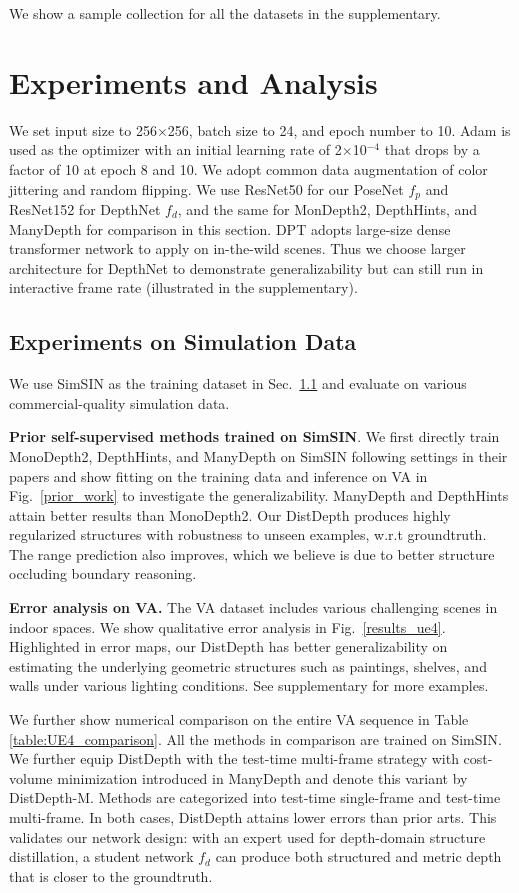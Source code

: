 \documentclass[10pt,twocolumn,letterpaper]{article}
\begin{document}
We show a sample collection for all the datasets in the supplementary.

\section{Experiments and Analysis}
\label{sec:analysis}

We set input size to 256$\times$256, batch size to 24, and epoch number to 10. Adam \cite{kingma2014adam} is used as the optimizer with an initial learning rate of 2$\times$10$^{-4}$ that drops by a factor of 10 at epoch 8 and 10. We adopt common data augmentation of color jittering and random flipping. We use ResNet50 for our PoseNet $f_p$ and ResNet152 for DepthNet $f_d$, and the same for MonDepth2, DepthHints, and ManyDepth for comparison in this section. DPT adopts large-size dense transformer network to apply on in-the-wild scenes. Thus we choose larger architecture for DepthNet to demonstrate generalizability but can still run in interactive frame rate (illustrated in the supplementary).

\subsection{Experiments on Simulation Data}
\label{sec:exp_sim}
We use SimSIN as the training dataset in Sec.~\ref{sec:exp_sim} and evaluate on various commercial-quality simulation data.

\textbf{Prior self-supervised methods trained on SimSIN}. We first directly train MonoDepth2, DepthHints, and ManyDepth on SimSIN following settings in their papers and show fitting on the training data and inference on VA in Fig.~\ref{prior_work} to investigate the generalizability. ManyDepth and DepthHints attain better results than MonoDepth2. Our DistDepth produces highly regularized structures with  robustness to unseen examples, w.r.t groundtruth. The range prediction also improves, which we believe is due to better structure occluding boundary reasoning.

\textbf{Error analysis on VA.}
The VA dataset includes various challenging scenes in indoor spaces. We show qualitative error analysis in Fig.~\ref{results_ue4}. Highlighted in error maps, our DistDepth has better generalizability on estimating the underlying geometric structures such as paintings, shelves, and walls under various lighting conditions. See supplementary for more examples.

We further show numerical comparison on the entire VA sequence in Table \ref{table:UE4_comparison}. 
All the methods in comparison are trained on SimSIN. We further equip DistDepth with the test-time multi-frame strategy with cost-volume minimization introduced in ManyDepth and denote this variant by DistDepth-M. 
Methods are categorized into test-time single-frame and test-time multi-frame. In both cases, DistDepth attains lower errors than prior arts. This validates our network design: with an expert used for depth-domain structure distillation, a student network $f_d$ can produce both structured and metric depth that is closer to the groundtruth.
\end{document}
